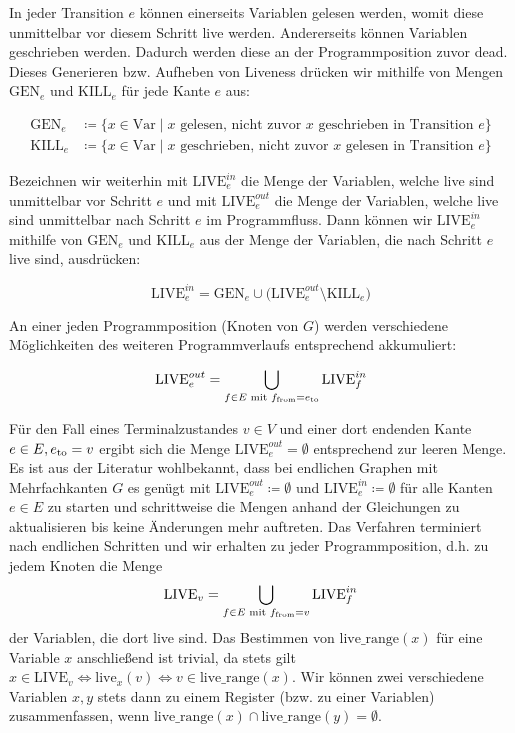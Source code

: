 \documentclass[a4paper]{article}
\theoremstyle{nonumberplain}
\begin{document}
In jeder Transition $e$ können einerseits Variablen gelesen werden, womit diese unmittelbar vor diesem Schritt live werden. Andererseits können Variablen geschrieben werden. Dadurch werden diese an der Programmposition zuvor dead. Dieses Generieren bzw. Aufheben von Liveness drücken wir mithilfe von Mengen $\mathrm{GEN}_{e}$ und $\mathrm{KILL}_{e}$ für jede Kante $e$ aus:

\begin{align}
\mathrm{GEN}_{e} & \coloneqq \{x \in \mathrm{Var} \mid \text{$x$ gelesen, nicht zuvor $x$ geschrieben in Transition $e$} \} \nonumber \\
\mathrm{KILL}_{e} & \coloneqq \{x \in \mathrm{Var} \mid \text{$x$ geschrieben, nicht zuvor $x$ gelesen in Transition $e$} \} \nonumber
\end{align}

Bezeichnen wir weiterhin mit $\mathrm{LIVE}^{in}_{e}$ die Menge der Variablen, welche live sind unmittelbar vor Schritt $e$ und mit $\mathrm{LIVE}^{out}_{e}$ die Menge der Variablen, welche live sind unmittelbar nach Schritt $e$ im Programmfluss. Dann können wir $\mathrm{LIVE}^{in}_{e}$ mithilfe von $\mathrm{GEN}_{e}$ und $\mathrm{KILL}_{e}$ aus der Menge der Variablen, die nach Schritt $e$ live sind, ausdrücken:

\begin{equation*}
\mathrm{LIVE}^{in}_{e} = \mathrm{GEN}_{e} \cup \big( \mathrm{LIVE}^{out}_{e} \setminus \mathrm{KILL}_{e} \big) 
\end{equation*}

An einer jeden Programmposition (Knoten von $G$) werden verschiedene Möglichkeiten des weiteren Programmverlaufs entsprechend akkumuliert:

\begin{equation*}
\mathrm{LIVE}^{out}_{e} = \bigcup_{f \in E \textrm{ mit } f_{\mathrm{from}} = e_{\mathrm{to}}} {\mathrm{LIVE}^{in}_{f}  }
\end{equation*}

Für den Fall eines Terminalzustandes $v \in V$ und einer dort endenden Kante $e \in E, e_{\mathrm{to}} = v$ ergibt sich die Menge $\mathrm{LIVE}^{out}_{e} = \emptyset$ entsprechend zur leeren Menge.
Es ist aus der Literatur wohlbekannt, dass bei endlichen Graphen mit Mehrfachkanten $G$ es genügt mit $\mathrm{LIVE}^{out}_{e} \coloneqq \emptyset$ und $\mathrm{LIVE}^{in}_{e} \coloneqq \emptyset$ für alle Kanten $e \in E$ zu starten und schrittweise die Mengen anhand der Gleichungen zu aktualisieren bis keine Änderungen mehr auftreten. Das Verfahren terminiert nach endlichen Schritten und wir erhalten zu jeder Programmposition, d.h. zu jedem Knoten die Menge \[
\textrm{LIVE}_v = \bigcup_{f \in E \textrm{ mit } f_{\mathrm{from}} = v} {\mathrm{LIVE}^{in}_{f}  }
\] der Variablen, die dort live sind. Das Bestimmen von $\textrm{live\_range}(x)$ für eine Variable $x$ anschließend ist trivial, da stets gilt $x \in \textrm{LIVE}_v \Leftrightarrow \textrm{live}_x(v) \Leftrightarrow v \in \textrm{live\_range}(x)$.
Wir können zwei verschiedene Variablen $x, y$ stets dann zu einem Register (bzw. zu einer Variablen) zusammenfassen, wenn $\textrm{live\_range}(x) \cap \textrm{live\_range}(y) = \emptyset $.
\end{document}
